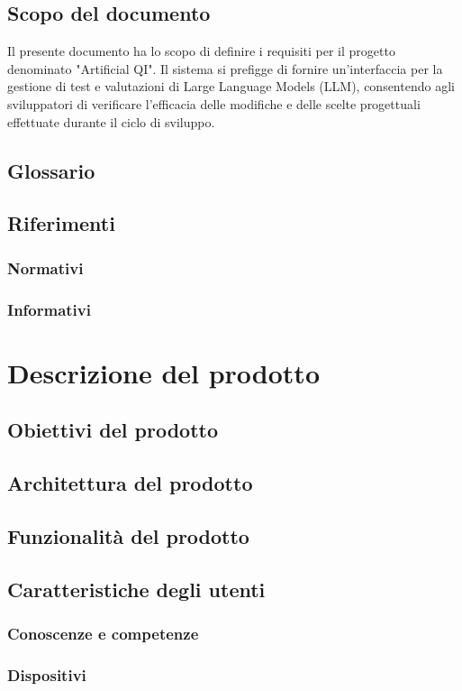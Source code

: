 \documentclass[a4paper, 12pt]{article}
\begin{document}
\subsection{Scopo del documento}
Il presente documento ha lo scopo di definire i requisiti per il progetto denominato "Artificial QI". Il sistema si prefigge di fornire un'interfaccia per la gestione di test e valutazioni di Large Language Models (LLM), consentendo agli sviluppatori di verificare l'efficacia delle modifiche e delle scelte progettuali effettuate durante il ciclo di sviluppo.
\subsection{Glossario}
\subsection{Riferimenti}
\subsubsection{Normativi}
\subsubsection{Informativi}

\section{Descrizione del prodotto}
\subsection{Obiettivi del prodotto}
\subsection{Architettura del prodotto}
\subsection{Funzionalità del prodotto}
\subsection{Caratteristiche degli utenti}
\subsubsection{Conoscenze e competenze}
\subsubsection{Dispositivi}
\end{document}
